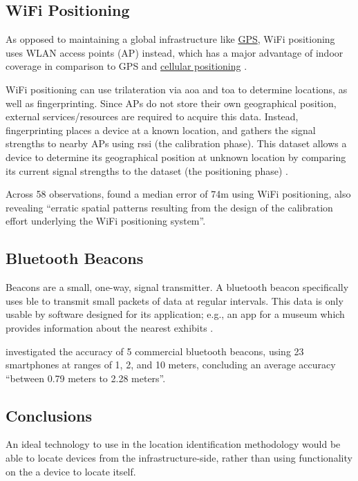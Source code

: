 \subsection{WiFi Positioning}

As opposed to maintaining a global infrastructure like
\hyperref[ss:gps]{GPS}, WiFi positioning uses WLAN access
points (AP) instead, which has a major advantage of indoor
coverage in comparison to GPS and
\hyperref[ss:cellPos]{cellular positioning}
\parencite{locationComparison}.

WiFi positioning can use \gls{trilateration} via \gls{aoa}
and \gls{toa} to determine locations, as well as
fingerprinting.
Since APs do not store their own geographical position,
external services/resources are required to acquire this
data.
Instead, fingerprinting places a device at a known
location, and gathers the signal strengths to nearby APs
using \gls{rssi} (the calibration phase).
This dataset allows a device to determine its geographical
position at unknown location by comparing its current
signal strengths to the dataset (the positioning phase)
\parencite{locationComparison}.

Across 58 observations, \cite{locationComparison} found a
median error of 74m using WiFi positioning, also revealing
\enquote{erratic spatial patterns resulting from the design
  of the calibration effort underlying the WiFi positioning
  system}.

\subsection{Bluetooth Beacons}

Beacons are a small, one-way, signal transmitter.
A bluetooth beacon specifically uses \gls{ble} to transmit
small packets of data at regular intervals.
This data is only usable by software designed for its
application; e.g., an app for a museum which provides
information about the nearest exhibits
\parencite{usingBluetoothBeacons}.

\cite{bluetoothBeaconAccuracy} investigated the accuracy of
5 commercial bluetooth beacons, using 23 smartphones at
ranges of 1, 2, and 10 meters, concluding an average
accuracy \enquote{between 0.79 meters to 2.28 meters}.

\subsection{Conclusions}

An ideal technology to use in the location identification
methodology would be able to locate devices from the
infrastructure-side, rather than using functionality on the
a device to locate itself.

